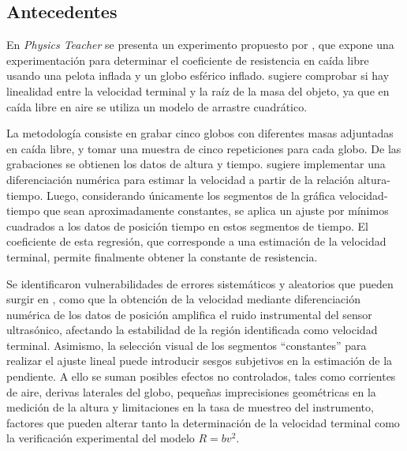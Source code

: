 \documentclass[12pt,a4paper]{config/myConfig}
\begin{document}
\subsection{Antecedentes}
\label{sec:ANTECEDENTES}

\indent En \textit{Physics Teacher} se presenta un experimento propuesto por \citet{gluck2003air}, que expone una experimentación para determinar el coeficiente de resistencia en caída libre usando una pelota inflada y un globo esférico inflado. \citeauthor{gluck2003air} sugiere comprobar si hay linealidad entre la velocidad terminal y la raíz de la masa del objeto, ya que en caída libre en aire se utiliza un modelo de arrastre cuadrático. 

\indent La metodología consiste en grabar cinco globos con diferentes masas adjuntadas en caída libre, y tomar una muestra de cinco repeticiones para cada globo. De las grabaciones se obtienen los datos de altura y tiempo. \citeauthor{gluck2003air} sugiere implementar una diferenciación numérica para estimar la velocidad a partir de la relación altura-tiempo. Luego, considerando únicamente los segmentos de la gráfica velocidad-tiempo que sean aproximadamente constantes, se aplica un ajuste por mínimos cuadrados a los datos de posición tiempo en estos segmentos de tiempo. El coeficiente de esta regresión, que corresponde a una estimación de la velocidad terminal, permite finalmente obtener la constante de resistencia. 

\indent Se identificaron vulnerabilidades de errores sistemáticos y aleatorios que pueden surgir en \citet{gluck2003air}, como que la obtención de la velocidad mediante diferenciación numérica de los datos de posición amplifica el ruido instrumental del sensor ultrasónico, afectando la estabilidad de la región identificada como velocidad terminal. Asimismo, la selección visual de los segmentos “constantes” para realizar el ajuste lineal puede introducir sesgos subjetivos en la estimación de la pendiente. A ello se suman posibles efectos no controlados, tales como corrientes de aire, derivas laterales del globo, pequeñas imprecisiones geométricas en la medición de la altura y limitaciones en la tasa de muestreo del instrumento, factores que pueden alterar tanto la determinación de la velocidad terminal como la verificación experimental del modelo $R = b v^2$.
\end{document}
